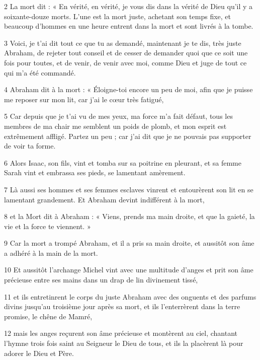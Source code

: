 \par 2 La mort dit : « En vérité, en vérité, je vous dis dans la vérité de Dieu qu'il y a soixante-douze morts. L'une est la mort juste, achetant son temps fixe, et beaucoup d'hommes en une heure entrent dans la mort et sont livrés à la tombe.

\par 3 Voici, je t'ai dit tout ce que tu as demandé, maintenant je te dis, très juste Abraham, de rejeter tout conseil et de cesser de demander quoi que ce soit une fois pour toutes, et de venir, de venir avec moi, comme Dieu et juge de tout ce qui m’a été commandé.

\par 4 Abraham dit à la mort : « Éloigne-toi encore un peu de moi, afin que je puisse me reposer sur mon lit, car j'ai le cœur très fatigué,

\par 5 Car depuis que je t'ai vu de mes yeux, ma force m'a fait défaut, tous les membres de ma chair me semblent un poids de plomb, et mon esprit est extrêmement affligé. Partez un peu ; car j’ai dit que je ne pouvais pas supporter de voir ta forme.

\par 6 Alors Isaac, son fils, vint et tomba sur sa poitrine en pleurant, et sa femme Sarah vint et embrassa ses pieds, se lamentant amèrement.

\par 7 Là aussi ses hommes et ses femmes esclaves vinrent et entourèrent son lit en se lamentant grandement. Et Abraham devint indifférent à la mort,

\par 8 et la Mort dit à Abraham : « Viens, prends ma main droite, et que la gaieté, la vie et la force te viennent. »

\par 9 Car la mort a trompé Abraham, et il a pris sa main droite, et aussitôt son âme a adhéré à la main de la mort.

\par 10 Et aussitôt l'archange Michel vint avec une multitude d'anges et prit son âme précieuse entre ses mains dans un drap de lin divinement tissé,

\par 11 et ils entretinrent le corps du juste Abraham avec des onguents et des parfums divins jusqu'au troisième jour après sa mort, et ils l'enterrèrent dans la terre promise, le chêne de Mamré,

\par 12 mais les anges reçurent son âme précieuse et montèrent au ciel, chantant l'hymne trois fois saint au Seigneur le Dieu de tous, et ils la placèrent là pour adorer le Dieu et Père.

